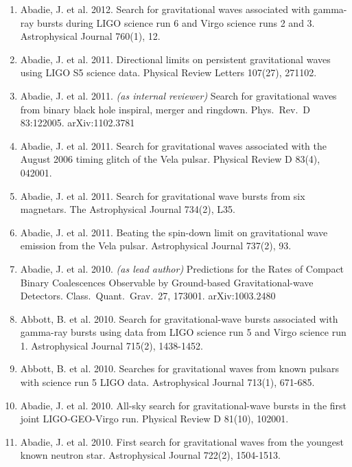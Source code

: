 \documentclass[margin,line]{res}
\begin{document}
\begin{resume}
\begin{enumerate}
\item Abadie, J. et al. 2012. Search for gravitational waves associated with gamma-ray bursts during LIGO science run 6 and Virgo science runs 2 and 3. Astrophysical Journal 760(1), 12. 

\item Abadie, J. et al. 2011. Directional limits on persistent gravitational waves using LIGO S5 science data. Physical Review Letters 107(27),  271102. 

\item  Abadie, J. et al.  2011. {\it (as internal reviewer)}  Search for gravitational waves from binary black hole inspiral, merger and ringdown.  Phys.~Rev.~D 83:122005. arXiv:1102.3781

\item Abadie, J. et al. 2011. Search for gravitational waves associated with the August 2006 timing glitch of the Vela pulsar. Physical Review D 83(4), 042001.

\item Abadie, J. et al. 2011. Search for gravitational wave bursts from six magnetars. The Astrophysical Journal 734(2), L35.

\item Abadie, J. et al. 2011. Beating the spin-down limit on gravitational wave emission from the Vela pulsar. Astrophysical Journal 737(2),  93. 

\item  Abadie, J. et al. 2010.  {\it (as lead author)}  Predictions for the Rates of Compact Binary Coalescences Observable by Ground-based Gravitational-wave Detectors.  Class.~Quant.~Grav.~27, 173001. arXiv:1003.2480  

\item Abbott, B. et al. 2010. Search for gravitational-wave bursts associated with gamma-ray bursts using data from LIGO science run 5 and Virgo science run 1. Astrophysical Journal 715(2), 1438-1452. 

\item Abbott, B. et al. 2010. Searches for gravitational waves from known pulsars with science run 5 LIGO data. Astrophysical Journal 713(1), 671-685. 

\item Abadie, J. et al. 2010. All-sky search for gravitational-wave bursts in the first joint LIGO-GEO-Virgo run. Physical Review D 81(10), 102001. 

\item Abadie, J. et al. 2010. First search for gravitational waves from the youngest known neutron star. Astrophysical Journal 722(2), 1504-1513. 


\end{enumerate}
\end{resume}
\end{document}
